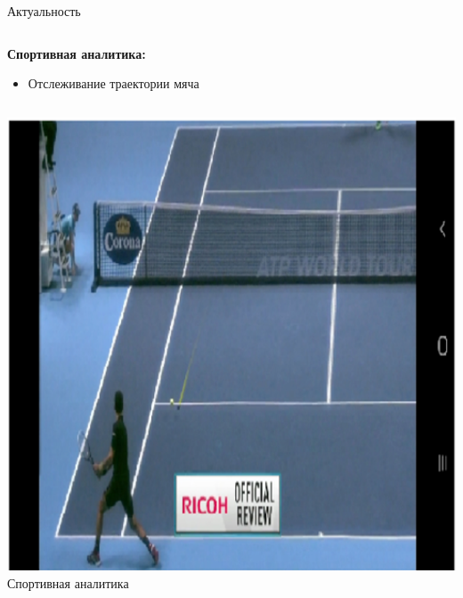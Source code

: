 \documentclass{beamer} %
\begin{document}
\begin{frame}{Актуальность}
  \begin{columns}[T]
    \begin{column}{\textwidth}
      \textbf{Спортивная аналитика:}
      \begin{itemize}
        \item Отслеживание траектории мяча
      \end{itemize}
    \end{column}
  \end{columns}
  \vspace{0.5cm}
  \begin{columns}
    \begin{column}{0.5\textwidth}
      \centering
      \includegraphics[width=\linewidth]{review/ball_track.png}
      \small Спортивная аналитика
    \end{column}
  \end{columns}
\end{frame}
\end{document}
